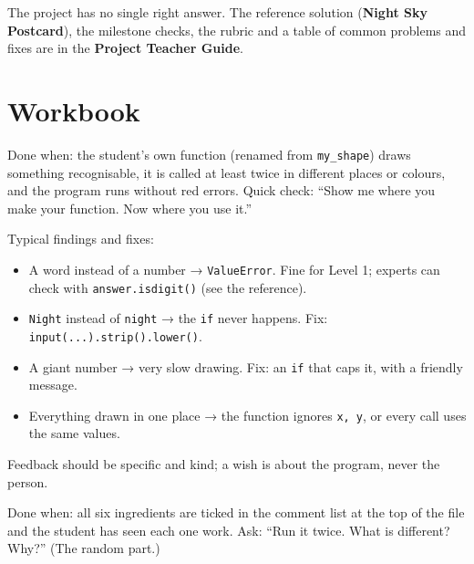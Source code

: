
\begin{teachernote}
The project has no single right answer. The reference solution (\textbf{Night Sky Postcard}), the milestone checks, the rubric and a table of common problems and fixes are in the \textbf{Project Teacher Guide}.
\end{teachernote}

\section{Workbook}
\begin{answer}
Done when: the student's own function (renamed from \texttt{my\_shape}) draws something recognisable, it is called at least twice in different places or colours, and the program runs without red errors. Quick check: \enquote{Show me where you make your function. Now where you use it.}
\end{answer}

\begin{answer}
Typical findings and fixes:
\begin{itemize}[leftmargin=1.2em,itemsep=1pt]
  \item A word instead of a number → \texttt{ValueError}. Fine for Level 1; experts can check with \texttt{answer.isdigit()} (see the reference).
  \item \texttt{Night} instead of \texttt{night} → the \texttt{if} never happens. Fix: \texttt{input(...).strip().lower()}.
  \item A giant number → very slow drawing. Fix: an \texttt{if} that caps it, with a friendly message.
  \item Everything drawn in one place → the function ignores \texttt{x, y}, or every call uses the same values.
\end{itemize}
Feedback should be specific and kind; a wish is about the program, never the person.
\end{answer}

\begin{answer}
Done when: all six ingredients are ticked in the comment list at the top of the file and the student has seen each one work. Ask: \enquote{Run it twice. What is different? Why?} (The random part.)
\end{answer}

